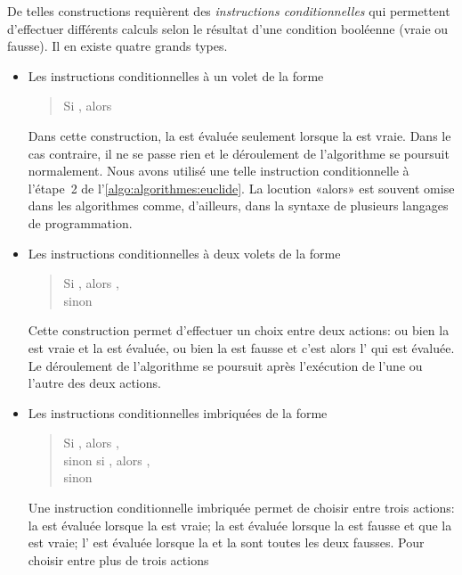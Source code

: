 De telles constructions requièrent des \emph{instructions
  conditionnelles} qui permettent d'effectuer différents calculs selon
le résultat d'une condition booléenne (vraie ou fausse). Il en existe
quatre grands types.

\begin{itemize}
\item Les instructions conditionnelles à un volet de la forme
  \begin{quote}
    Si , alors 
  \end{quote}
  Dans cette construction, la  est évaluée seulement
  lorsque la  est vraie. Dans le cas contraire, il ne
  se passe rien et le déroulement de l'algorithme se poursuit
  normalement. Nous avons utilisé une telle instruction conditionnelle
  à l'étape~2 de l'\autoref{algo:algorithmes:euclide}. La locution
  «alors» est souvent omise dans les algorithmes comme, d'ailleurs,
  dans la syntaxe de plusieurs langages de programmation.
\item Les instructions conditionnelles à deux volets de la forme
  \begin{quote}
    Si , alors , \\
    sinon 
  \end{quote}
  Cette construction permet d'effectuer un choix entre deux actions:
  ou bien la  est vraie et la  est
  évaluée, ou bien la  est fausse et c'est alors
  l' qui est évaluée. Le déroulement de l'algorithme
  se poursuit après l'exécution de l'une ou l'autre des deux actions.
\item Les instructions conditionnelles imbriquées de la forme
  \begin{quote}
    Si , alors , \\
    sinon si , alors , \\
    sinon 
  \end{quote}
  Une instruction conditionnelle imbriquée permet de choisir entre
  trois actions: la  est évaluée lorsque la
   est vraie; la  est évaluée
  lorsque la  est fausse et que la
   est vraie; l' est évaluée
  lorsque la  et la  sont toutes
  les deux fausses. Pour choisir entre plus de trois actions

\end{itemize}
